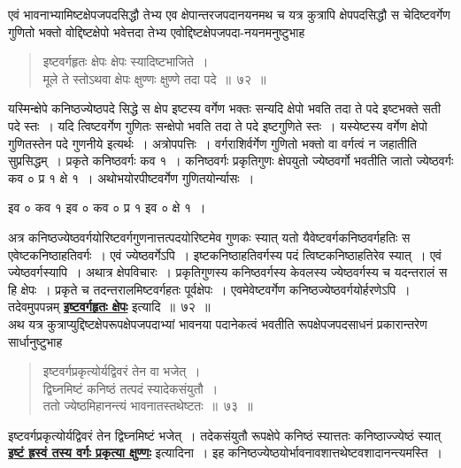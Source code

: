 \documentclass[11pt, openany]{book}
\makeatletter
\newcommand{\devanagarinumeral}[1]{%
 \devanagaridigits{\number\csname c@#1\endcsname}}
\makeatother
\begin{document}
\s\onehalfspacing
\fancyhead[LE,RO]{\thepage}
\cfoot{}
\renewcommand{\thepage}{\devanagarinumeral{page}}
\setcounter{page}{114}

 एवं भावनाभ्यामिष्टक्षेपजपदसिद्धौ तेभ्य एव क्षेपान्तरजपदानयनमथ च यत्र 
कुत्रापि क्षेपपदसिद्धौ स चेदिष्टवर्गेण गुणितो भक्तो वोद्दिष्टक्षेपो
भवेत्तदा तेभ्य एवोद्दिष्टक्षेपजपदा-नयनमनुष्टुभाह\textendash

 \label{72}
\begin{quote}
    \ab 
     इष्टवर्गहृतः क्षेपः क्षेपः स्यादिष्टभाजिते~। \\
 मूले ते स्तोऽथवा क्षेपः क्षुण्णः क्षुण्णे तदा पदे~॥~७२~॥
\end{quote}

यस्मिन्क्षेपे कनिष्ठज्येष्ठपदे सिद्धे स क्षेप इष्टस्य वर्गेण भक्तः
सन्यदि क्षेपो भवति तदा ते पदे इष्टभक्ते सती पदे स्तः~। यदि त्विष्टवर्गेण गुणितः 
सन्क्षेपो भवति तदा ते पदे इष्टगुणिते स्तः~। यस्येष्टस्य वर्गेण क्षेपो
गुणितस्तेन पदे गुणनीये इत्यर्थः~। अत्रोपपत्तिः~। वर्गराशिर्वर्गेण गुणितो भक्तो वा
वर्गत्वं न जहातीति सुप्रसिद्धम्~। प्रकृते कनिष्ठवर्गः कव १~। कनिष्ठवर्गः प्रकृतिगुणः
क्षेपयुतो ज्येष्ठवर्गो 
भवतीति जातो ज्येष्ठवर्गः कव ० प्र १ क्षे १~। अथोभयोरपीष्टवर्गेण
गुणितयोर्न्यासः~। 
\vspace{-1mm}

\begin{center}
    इव ० कव १ इव ० कव ० प्र १ इव ० क्षे १~। 
\end{center} 
\vspace{-1mm}

 अत्र कनिष्ठज्येष्ठवर्गयोरिष्टवर्गगुणनात्तत्पदयोरिष्टमेव गुणकः स्यात्
यतो यैवेष्टवर्गकनिष्ठवर्गहतिः स एवेष्टकनिष्ठाहतिवर्गः~। एवं ज्येष्ठवर्गेऽपि~। इष्टकनिष्ठाहतिवर्गस्य पदं त्विष्टकनिष्ठाहतिरेव स्यात्~। एवं ज्येष्ठवर्गस्यापि~।
अथात्र क्षेपविचारः~। 
प्रकृतिगुणस्य कनिष्ठवर्गस्य केवलस्य ज्येष्ठवर्गस्य च यदन्तरालं स हि
क्षेपः~। प्रकृते च तदन्तरालमिष्टवर्गहतः पूर्वक्षेपः~। एवमेवेष्टवर्गेण
कनिष्ठज्येष्ठवर्गयोर्हरणेऽपि~। तदेवमुपपन्नम् \hyperref[72]{\textbf{इष्टवर्गहृतः क्षेपः}} इत्यादि~॥~७२~॥~\\

\vspace{-2mm}
 अथ यत्र कुत्राप्युद्दिष्टक्षेपरूपक्षेपजपदाभ्यां भावनया पदानेकत्वं
भवतीति रूपक्षेपजपदसाधनं प्रकारान्तरेण सार्धानुष्टुभाह\textendash

 \label{73}
\begin{quote}
    \ab 
      इष्टवर्गप्रकृत्योर्यद्विवरं तेन वा भजेत्~। \\
 द्विघ्नमिष्टं कनिष्ठं तत्पदं स्यादेकसंयुतौ~। \\
 ततो ज्येष्ठमिहानन्त्यं भावनातस्तथेष्टतः~॥~७३~॥

\end{quote}
\newpage
इष्टवर्गप्रकृत्योर्यद्विवरं तेन द्विघ्नमिष्टं भजेत्~। तदेकसंयुतौ
रूपक्षेपे कनिष्ठं स्यात्ततः कनिष्ठाज्ज्येष्ठं स्यात् \hyperref[70]{\textbf{इष्टं ह्रस्वं तस्य वर्गः प्रकृत्या क्षुण्णः}} इत्यादिना~। 
इह कनिष्ठज्येष्ठयोर्भावनावशात्तथेष्टवशादानन्त्यमस्ति~। \\
\end{document}
